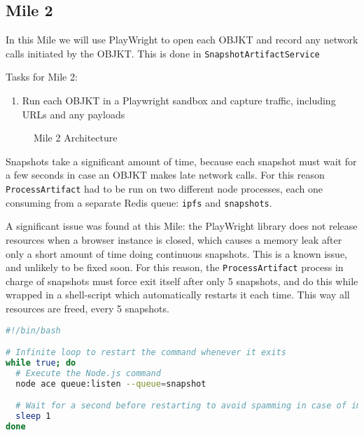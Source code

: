 \subsection {Mile 2}

In this Mile we will use PlayWright to open each OBJKT and record any network calls initiated by the OBJKT. This is done in \texttt{SnapshotArtifactService}

Tasks for Mile 2:
\begin{enumerate}
	\item Run each OBJKT in a Playwright sandbox and capture traffic, including URLs and any payloads
\end{enumerate}



\begin{figure}[h]
    \centering
    
    \caption[Mile 2 Architecture]{Mile 2 Architecture}
    \label{fig:mile2-arch}
\end{figure}


Snapshots take a significant amount of time, because each snapshot must wait for a few seconds in case an OBJKT makes late network calls. For this reason \texttt{ProcessArtifact} had to be run on two different node processes, each one consuming from a separate Redis queue: \texttt{ipfs} and \texttt{snapshots}.

A significant issue was found at this Mile: the PlayWright library does not release resources when a browser instance is closed, which causes a memory leak after only a short amount of time doing continuous snapshots. This is a known issue, and unlikely to be fixed soon. For this reason, the \texttt{ProcessArtifact} process in charge of snapshots must force exit itself after only 5 snapshots, and do this while wrapped in a shell-script which automatically restarts it each time. This way all resources are freed, every 5 snapshots.


\vspace{0.5cm}

\begin{lstlisting}[language=bash, caption={runSnapshotWorker.sh}] 
#!/bin/bash

# Infinite loop to restart the command whenever it exits
while true; do
  # Execute the Node.js command
  node ace queue:listen --queue=snapshot

  # Wait for a second before restarting to avoid spamming in case of immediate failure
  sleep 1
done
\end{lstlisting}


